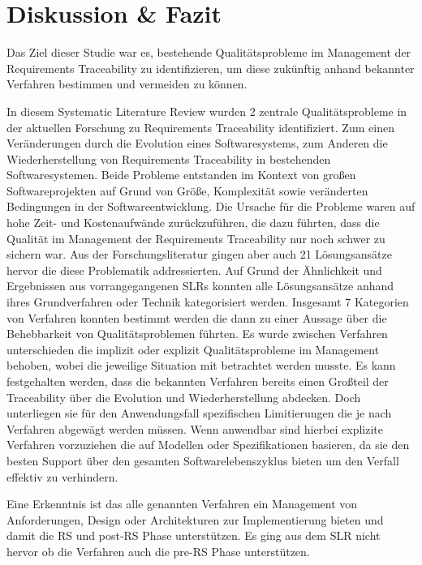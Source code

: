 \section{Diskussion \& Fazit}
\label{sec:DiskussionFazit}

Das Ziel dieser Studie war es, bestehende Qualitätsprobleme im Management der Requirements Traceability zu identifizieren, um diese zukünftig anhand bekannter Verfahren bestimmen und vermeiden zu können.

In diesem Systematic Literature Review wurden 2 zentrale Qualitätsprobleme in der aktuellen Forschung zu Requirements Traceability identifiziert. Zum einen Veränderungen durch die Evolution eines Softwaresystems, zum Anderen die Wiederherstellung von Requirements Traceability in bestehenden Softwaresystemen. Beide Probleme entstanden im Kontext von großen Softwareprojekten auf Grund von Größe, Komplexität sowie veränderten Bedingungen in der Softwareentwicklung. Die Ursache für die Probleme waren auf hohe Zeit- und Kostenaufwände zurückzuführen, die dazu führten, dass die Qualität im Management der Requirements Traceability nur noch schwer zu sichern war. Aus der Forschungsliteratur gingen aber auch 21 Lösungsansätze hervor die diese Problematik addressierten. Auf Grund der Ähnlichkeit und Ergebnissen aus vorrangegangenen SLRs konnten alle Lösungsansätze anhand ihres Grundverfahren oder Technik kategorisiert werden. Insgesamt 7 Kategorien von Verfahren konnten bestimmt werden die dann zu einer Aussage über die Behebbarkeit von Qualitätsproblemen führten. Es wurde zwischen Verfahren unterschieden die implizit oder explizit Qualitätsprobleme im Management behoben, wobei die jeweilige Situation mit betrachtet werden musste. Es kann festgehalten werden, dass die bekannten Verfahren bereits einen Großteil der Traceability über die Evolution und Wiederherstellung abdecken. Doch unterliegen sie für den Anwendungsfall spezifischen Limitierungen die je nach Verfahren abgewägt werden müssen. Wenn anwendbar sind hierbei explizite Verfahren vorzuziehen die auf Modellen oder Spezifikationen basieren, da sie den besten Support über den gesamten Softwarelebenszyklus bieten um den Verfall effektiv zu verhindern. 

Eine Erkenntnis ist das alle genannten Verfahren ein Management von Anforderungen, Design oder Architekturen zur Implementierung bieten und damit die RS und post-RS Phase unterstützen. Es ging aus dem SLR nicht hervor ob die Verfahren auch die pre-RS Phase unterstützen.


